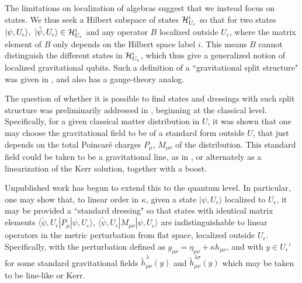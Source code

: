 The limitations on localization of algebras suggest that we instead focus on states.  We thus seek a Hilbert subspace of states ${\cal H}^i_{U_\epsilon}$ so that for two states $|\psi,U_\epsilon \rangle,\ |\tilde \psi,U_\epsilon \rangle\in {\cal H}^i_{U_\epsilon}$ and any operator $B$ localized outside $U_\epsilon$, 
%
\eqn{}
%
where the matrix element of $B$ only depends on the Hilbert space label $i$.  This means $B$ cannot distinguish the different states in ${\cal H}^i_{U_\epsilon}$, which thus give a generalized notion of localized gravitational qubits.  Such a definition of a ``gravitational split structure" was given in , and also has a gauge-theory analog.

The question of whether it is possible to find states and dressings with such split structure was preliminarily addressed in \DoGithree, beginning at the classical level.  Specifically, for a given classical matter distribution in $U$, it was shown that one may choose the gravitational field to be of a standard form outside $U$, that just depends on the total Poincar\'e charges $P_\mu$, $M_{\mu \nu}$ of the distribution.  This standard field could be taken to be a gravitational line, as in \DoGione, or alternately as a linearization of the Kerr solution, together with a boost.

Unpublished work has begun to extend this to the quantum level.  In particular, one may show that, to linear order in $\kappa$, given a state 
$|\psi,U_\epsilon\rangle$ localized to $U_\epsilon$, it may be provided a ``standard dressing" so that states with identical matrix elements $\langle \tilde \psi,U_\epsilon|  P_\mu |\psi,U_\epsilon \rangle$, $\langle \tilde \psi,U_\epsilon|  M_{\mu\nu} |\psi,U_\epsilon \rangle$ are indistinguishable to linear operators in the metric perturbation from flat space, localized outside $U_\epsilon$.  Specifically, with the perturbation defined as $g_{\mu\nu}= \eta_{\mu\nu}+\kappa h_{\mu\nu}$, and with $y\in U_\epsilon'$
%
\eqn{}
%
for some standard gravitational fields ${\tilde h}_{\mu\nu}^\lambda(y)$ and ${\tilde h}_{\mu\nu}^{\lambda\sigma}(y)$ which may be taken to be line-like or Kerr.

